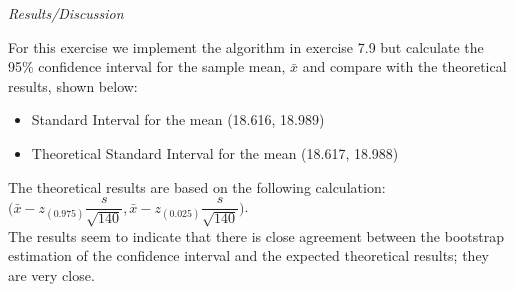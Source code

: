 \documentclass[12pt,a4paper]{article}
\begin{document}
\textit{Results/Discussion}

For this exercise we implement the algorithm in exercise 7.9 but calculate the 95\% confidence interval for the sample mean, $\bar{x}$ and compare with the theoretical results, shown below:\\

\begin{itemize}

\item{Standard Interval for the mean (18.616, 18.989)}
\item{Theoretical Standard Interval for the mean (18.617, 18.988)}

\end{itemize}

The theoretical results are based on the following calculation: $\biggr(\bar{x}-z_{(0.975)}\dfrac{s}{\sqrt{140}},\bar{x}-z_{(0.025)}\dfrac{s}{\sqrt{140}}\biggr)$.\\

The results seem to indicate that there is close agreement between the bootstrap estimation of the confidence interval and the expected theoretical results; they are very close.
\end{document}
